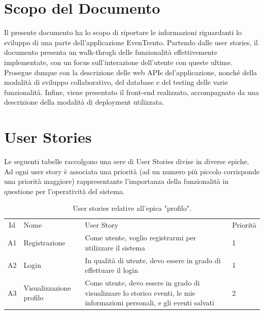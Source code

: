 \documentclass[9pt]{extarticle}
\begin{document}
\customtitle



\tableofcontents
\newpage

\section{Scopo del Documento}

Il presente documento ha lo scopo di riportare le informazioni riguardanti lo
sviluppo di una parte dell'applicazione EvenTrento. Partendo dalle user stories,
il documento presenta un walk-throgh delle funzionalità effettivemente
implementate, con un focus sull'interazione dell'utente con queste ultime.
Prosegue dunque con la descrizione delle web APIs del'applicazione, nonché
della modalità di sviluppo collaborativo, del database e del testing delle varie
funzionalità.
Infine, viene presentato il front-end realizzato, accompagnato da una
descrizione della modalità di deployment utilizzata.

\newpage

\section{User Stories}

Le seguenti tabelle raccolgono una sere di User Stories divise in diverse epiche. Ad ogni user story è associata una priorità (ad un numero più piccolo corrisponde una priorità maggiore) rappresentante l'importanza della funzionalità in questione per l'operatività del sistema.

	
\begin{table}[!htb]
	\centering
	\renewcommand{\arraystretch}{1.7} %
	\begin{tabular}{clp{7cm}l} %
		\toprule
		\rowcolor{gray!20}
		\multicolumn{4}{c}{\textbf{Profilo}}\\ \midrule
		\rowcolor{gray!20}
		Id & Nome & User Story & Priorità \\ \midrule
		A1  & Registrazione  & Come utente, voglio registrarmi per utilizzare il sistema & 1 \\
		A2  & Login & In qualità di utente, devo essere in grado di effettuare il login & 1 \\
		A3  & Visualizzazione profilo & Come utente, devo essere in grado di visualizzare lo storico eventi, le mie informazioni personali, e gli eventi salvati &  2\\
		\bottomrule
	\end{tabular}
	\caption{User stories relative all'epica "profilo".}
	\label{tab:profili}
\end{table}
\end{document}

